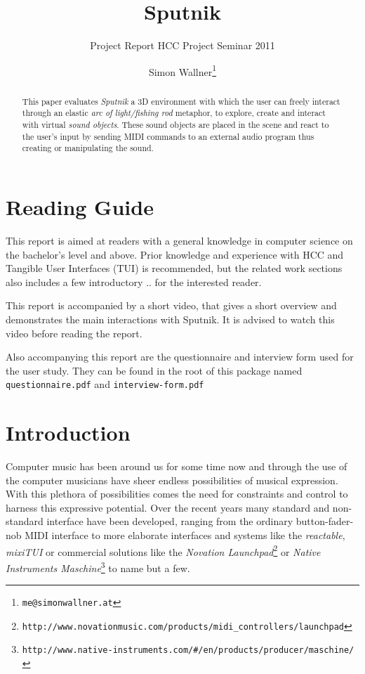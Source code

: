 \documentclass[10pt,a4paper]{scrartcl}
\title{Sputnik}
\subtitle{Project Report HCC Project Seminar 2011}
\author{Simon Wallner\footnote{\texttt{me@simonwallner.at}}}
\begin{document}
\maketitle

\begin{abstract}
This paper evaluates \emph{Sputnik} a 3D environment with which the user can freely interact through an elastic \emph{arc of light/fishing rod} metaphor, to explore, create and interact with virtual \emph{sound objects}. These sound objects are placed in the scene and react to the user's input by sending MIDI commands to an external audio program thus creating or manipulating the sound.

\end{abstract}

\section{Reading Guide}
This report is aimed at readers with a general knowledge in computer science on the bachelor's level and above. Prior knowledge and experience with HCC and Tangible User Interfaces (TUI) is recommended, but the related work sections also includes a few introductory .. for the interested reader.

This report is accompanied by a short video, that gives a short overview and demonstrates the main interactions with Sputnik. It is advised to watch this video before reading the report. 

Also accompanying this report are the questionnaire and interview form used for the user study. They can be found in the root of this package named \texttt{questionnaire.pdf} and \texttt{interview-form.pdf}


\section{Introduction}

Computer music has been around us for some time now and through the use of the computer musicians have sheer endless possibilities of musical expression. With this plethora of possibilities comes the need for constraints and control to harness this expressive potential. Over the recent years many standard and non-standard interface have been developed, ranging from the ordinary button-fader-nob MIDI interface to more elaborate interfaces and systems like the \emph{reactable}\cite{Jorda2007}, \emph{mixiTUI}\cite{Pedersen2009} or commercial solutions like the \emph{Novation Launchpad}\footnote{\texttt{http://www.novationmusic.com/products/midi\_controllers/launchpad}} or \emph{Native Instruments Maschine}\footnote{\texttt{http://www.native-instruments.com/\#/en/products/producer/maschine/}} to name but a few.
\end{document}

